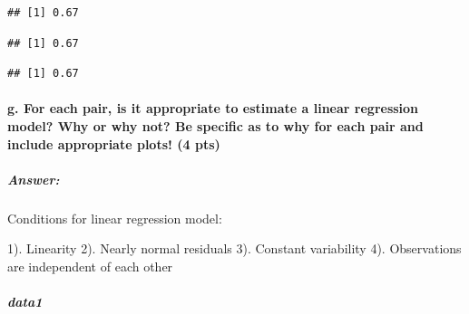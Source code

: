 \documentclass[]{article}
\newenvironment{Shaded}{\begin{snugshade}}{\end{snugshade}}
\newcommand{\KeywordTok}[1]{\textcolor[rgb]{0.13,0.29,0.53}{\textbf{#1}}}
\newcommand{\DataTypeTok}[1]{\textcolor[rgb]{0.13,0.29,0.53}{#1}}
\newcommand{\DecValTok}[1]{\textcolor[rgb]{0.00,0.00,0.81}{#1}}
\newcommand{\StringTok}[1]{\textcolor[rgb]{0.31,0.60,0.02}{#1}}
\newcommand{\OperatorTok}[1]{\textcolor[rgb]{0.81,0.36,0.00}{\textbf{#1}}}
\newcommand{\NormalTok}[1]{#1}
\let\oldparagraph\paragraph
\renewcommand{\paragraph}[1]{\oldparagraph{#1}\mbox{}}
\let\oldsubparagraph\subparagraph
\renewcommand{\subparagraph}[1]{\oldsubparagraph{#1}\mbox{}}
\begin{document}
\begin{verbatim}
## [1] 0.67
\end{verbatim}

\begin{Shaded}
\end{Shaded}

\begin{verbatim}
## [1] 0.67
\end{verbatim}

\begin{Shaded}
\end{Shaded}

\begin{verbatim}
## [1] 0.67
\end{verbatim}

\paragraph{g. For each pair, is it appropriate to estimate a linear
regression model? Why or why not? Be specific as to why for each pair
and include appropriate plots! (4
pts)}\label{g.-for-each-pair-is-it-appropriate-to-estimate-a-linear-regression-model-why-or-why-not-be-specific-as-to-why-for-each-pair-and-include-appropriate-plots-4-pts}

\subparagraph{Answer:}\label{answer-4}

Conditions for linear regression model:

1). Linearity 2). Nearly normal residuals 3). Constant variability 4).
Observations are independent of each other

\subparagraph{data1}\label{data1}

\begin{Shaded}
\end{Shaded}
\end{document}
